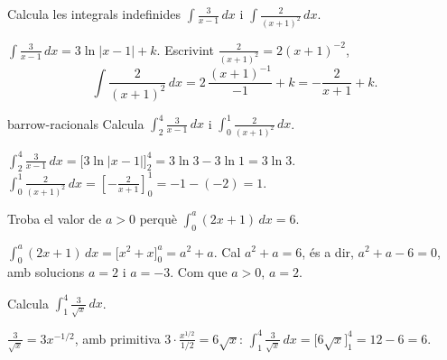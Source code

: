 \begin{apartats}

Calcula les integrals indefinides $\displaystyle\int\frac{3}{x-1}\,dx$ i
$\displaystyle\int\frac{2}{(x+1)^2}\,dx$.

\begin{solucio}
$\displaystyle\int\frac{3}{x-1}\,dx=3\ln|x-1|+k$. Escrivint $\frac2{(x+1)^2}=2(x+1)^{-2}$,
\[
\int\frac{2}{(x+1)^2}\,dx=2\,\frac{(x+1)^{-1}}{-1}+k=-\frac{2}{x+1}+k.
\]
\end{solucio}

\begin{tria}{barrow-racionals}
Calcula $\displaystyle\int_2^4\frac{3}{x-1}\,dx$ i $\displaystyle\int_0^1\frac{2}{(x+1)^2}\,dx$.

\begin{solucio}
$\displaystyle\int_2^4\frac{3}{x-1}\,dx=\bigl[3\ln|x-1|\bigr]_2^4=3\ln3-3\ln1=3\ln3$.\\
$\displaystyle\int_0^1\frac{2}{(x+1)^2}\,dx=\left[-\frac{2}{x+1}\right]_0^1=-1-(-2)=1$.
\end{solucio}

Troba el valor de $a>0$ perquè $\displaystyle\int_0^a(2x+1)\,dx=6$.

\begin{solucio}
$\displaystyle\int_0^a(2x+1)\,dx=\bigl[x^2+x\bigr]_0^a=a^2+a$. Cal $a^2+a=6$, és a dir, $a^2+a-6=0$, amb
solucions $a=2$ i $a=-3$. Com que $a>0$, $a=2$.
\end{solucio}
\end{tria}

\begin{nomesllarg}
Calcula $\displaystyle\int_1^4\frac{3}{\sqrt x}\,dx$.

\begin{solucio}
$\frac3{\sqrt x}=3x^{-1/2}$, amb primitiva $3\cdot\frac{x^{1/2}}{1/2}=6\sqrt x$:
$\displaystyle\int_1^4\frac{3}{\sqrt x}\,dx=\bigl[6\sqrt x\bigr]_1^4=12-6=6$.
\end{solucio}
\end{nomesllarg}

\end{apartats}
